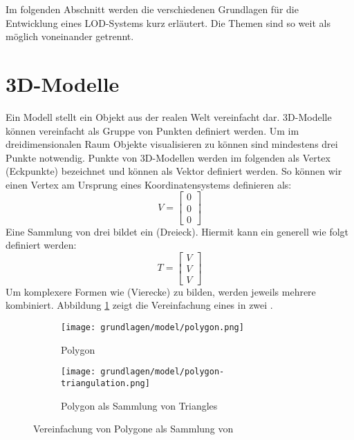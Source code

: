 
Im folgenden Abschnitt werden die verschiedenen Grundlagen für die Entwicklung eines LOD-Systems kurz erläutert. Die Themen sind so weit als möglich voneinander getrennt.

\section{3D-Modelle}
Ein Modell stellt ein Objekt aus der realen Welt vereinfacht dar.
3D-Modelle können vereinfacht als Gruppe von Punkten definiert werden.
Um im dreidimensionalen Raum Objekte visualisieren zu können sind mindestens drei Punkte notwendig.
Punkte von 3D-Modellen werden im folgenden als Vertex (Eckpunkte) bezeichnet und können als Vektor definiert werden.
So können wir einen Vertex am Ursprung eines Koordinatensystems definieren als:
$$ V =
\begin{bmatrix}
  0 \\
  0 \\
  0
\end{bmatrix}
$$
Eine Sammlung von drei  bildet ein  (Dreieck). Hiermit kann ein  generell wie folgt definiert werden:
$$ T =
\begin{bmatrix}
  V \\
  V \\
  V
\end{bmatrix}
$$
Um komplexere Formen wie  (Vierecke) zu bilden, werden jeweils mehrere  kombiniert. Abbildung \ref{fig:modelSimpleTriangulation} zeigt die Vereinfachung eines  in zwei .
\begin{figure}[H]
  \centering
  \begin{subfigure}{.5\textwidth}
    \centering
    \texttt{[image: grundlagen/model/polygon.png]}
    \caption{Polygon}
  \end{subfigure}%
  \begin{subfigure}{.5\textwidth}
    \centering
    \texttt{[image: grundlagen/model/polygon-triangulation.png]}
    \caption{Polygon als Sammlung von Triangles}
  \end{subfigure}
  \caption{Vereinfachung von Polygone als Sammlung von }
  \label{fig:modelSimpleTriangulation}
\end{figure}

